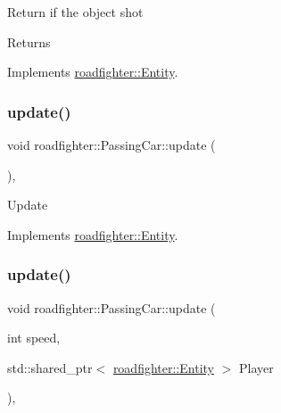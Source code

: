 Return if the object shot \begin{DoxyReturn}{Returns}

\end{DoxyReturn}


Implements \hyperlink{classroadfighter_1_1Entity_ad0ecaa0539db252e591da83814251509}{roadfighter\+::\+Entity}.

\mbox{\label{classroadfighter_1_1PassingCar_a45276fb9270a145fed9a7827a9ab7a46}} 
\subsubsection{\texorpdfstring{update()}{update()}\hspace{0.1cm}{\footnotesize\ttfamily [1/2]}}
{\footnotesize\ttfamily void roadfighter\+::\+Passing\+Car\+::update (\begin{DoxyParamCaption}{ }\end{DoxyParamCaption})\hspace{0.3cm}{\ttfamily [override]}, {\ttfamily [virtual]}}

Update 

Implements \hyperlink{classroadfighter_1_1Entity_a19cd353f12a3e8432acd6d5609137561}{roadfighter\+::\+Entity}.

\mbox{\label{classroadfighter_1_1PassingCar_af0667cf430382117beb4669777905cc7}} 
\subsubsection{\texorpdfstring{update()}{update()}\hspace{0.1cm}{\footnotesize\ttfamily [2/2]}}
{\footnotesize\ttfamily void roadfighter\+::\+Passing\+Car\+::update (\begin{DoxyParamCaption}\item[{int}]{speed,  }\item[{std\+::shared\+\_\+ptr$<$ \hyperlink{classroadfighter_1_1Entity}{roadfighter\+::\+Entity} $>$}]{Player }\end{DoxyParamCaption})\hspace{0.3cm}{\ttfamily [override]}, {\ttfamily [virtual]}}

